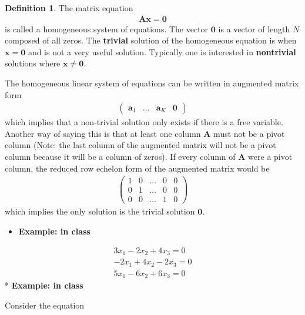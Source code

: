 \documentclass[
]{book}
\providecommand{\tightlist}{%
  \setlength{\itemsep}{0pt}\setlength{\parskip}{0pt}}
\theoremstyle{definition}
\newtheorem{definition}{Definition}[chapter]
\theoremstyle{definition}
\theoremstyle{definition}
\theoremstyle{definition}
\theoremstyle{remark}
\begin{document}
\begin{definition}
The matrix equation
\[
\begin{aligned}
\mathbf{A}\mathbf{x} = \mathbf{0}
\end{aligned}
\label{eq:homogeneous}
\]
is called a homogeneous system of equations. The vector \(\mathbf{0}\) is a vector of length \(N\) composed of all zeros. The \textbf{trivial} solution of the homogeneous equation is when \(\mathbf{x} = \mathbf{0}\) and is not a very useful solution. Typically one is interested in \textbf{nontrivial} solutions where \(\mathbf{x} \neq \mathbf{0}\).
\end{definition}

The homogeneous linear system of equations can be written in augmented matrix form
\[
\begin{aligned}
\begin{pmatrix} \mathbf{a}_1 & \ldots & \mathbf{a}_K & \mathbf{0} \end{pmatrix}
\end{aligned}
\]
which implies that a non-trivial solution only exists if there is a free variable. Another way of saying this is that at least one column \(\mathbf{A}\) must not be a pivot column (Note: the last column of the augmented matrix will not be a pivot column because it will be a column of zeros). If every column of \(\mathbf{A}\) were a pivot column, the reduced row echelon form of the augmented matrix would be
\[
\begin{aligned}
\begin{pmatrix}
1 & 0 & \ldots & 0 & 0 \\
0 & 1 & \ldots & 0 & 0 \\
0 & 0 & \ldots & 1 & 0 
\end{pmatrix}
\end{aligned}
\]
which implies the only solution is the trivial solution \(\mathbf{0}\).

\begin{itemize}
\tightlist
\item
  \textbf{Example: in class}
\end{itemize}

\[
\begin{aligned}
3 x_1 - 2 x_2 + 4 x_3 = 0 \\
- 2 x_1 + 4 x_2 - 2 x_3 = 0 \\
5 x_1 - 6 x_2 + 6 x_3 = 0
\end{aligned}
\]
* \textbf{Example: in class}

Consider the equation
\end{document}
